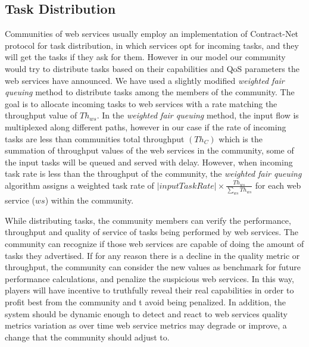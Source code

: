\documentclass[10pt,journal,cspaper,compsoc]{IEEEtran}
\begin{document}
\subsection{Task Distribution}

Communities of web services usually employ an implementation of Contract-Net protocol for task distribution, in which services opt for incoming tasks, and they will get the tasks if they ask for them. However in our model our community would try to distribute tasks based on their capabilities and QoS parameters the web services have announced. We have used a slightly modified \emph{weighted fair queuing} method to distribute tasks among the members of the community. The goal is to allocate incoming tasks to web services with a rate matching the throughput value of $Th_{ws}$. In the \emph{weighted fair queuing} method, the input flow is multiplexed along different paths, however in our case if the rate of incoming tasks are less than communities total throughput $(Th_{C})$ which is the summation of throughput values of the web services in the community, some of the input tasks will be queued and served with delay. 
However, when incoming task rate is less than the throughput of the community, the \emph{weighted fair queuing} algorithm assigns a weighted task rate of $|input Task Rate| \times \frac{Th_{ws}}{\sum_{ws}{Th_{ws}}}$ for each web service ($ws$) within the community.

While distributing tasks, the community members can verify the performance, throughput and quality of service of tasks being performed by web services. The community can recognize if those web services are capable of doing the amount of tasks they advertised. If for any reason there is a decline in the quality metric or throughput, the community can consider the new values as benchmark for future performance calculations, and penalize the suspicious web services. In this way, players will have incentive to truthfully reveal their real capabilities in order to profit best from the community and t  avoid being penalized. In addition, the system should be dynamic enough to detect and react to web services quality metrics variation as over time web service metrics may degrade or improve, a change that the community should adjust to.
\end{document}
